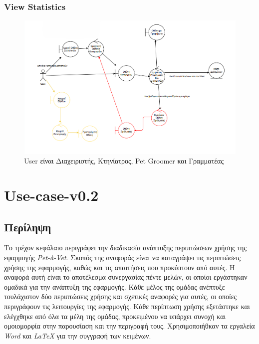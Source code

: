 \documentclass[12pt,a4paper,twoside]{book}
\begin{document}
\subsection{View Statistics}
\begin{figure}[H]
    \centering
    \includegraphics[width=\textwidth]{Resources/Robustness Diagram/Statistics.png}
    \caption{User είναι Διαχειριστής, Κτηνίατρος, Pet Groomer και Γραμματέας}\label{fig:robustness-view-statistics}
\end{figure}

\chapter{Use-case-v0.2}

\section{Περίληψη}

Το τρέχον κεφάλαιο περιγράφει την διαδικασία ανάπτυξης περιπτώσεων χρήσης της εφαρμογής \textit{Pet-à-Vet}. Σκοπός της αναφοράς είναι να καταγράψει τις περιπτώσεις χρήσης της εφαρμογής, καθώς και τις απαιτήσεις που προκύπτουν από αυτές. Η αναφορά αυτή είναι το αποτέλεσμα συνεργασίας πέντε μελών, οι οποίοι εργάστηκαν ομαδικά για την ανάπτυξη της εφαρμογής. Κάθε μέλος της ομάδας ανέπτυξε τουλάχιστον δύο περιπτώσεις χρήσης και σχετικές αναφορές για αυτές, οι οποίες περιγράφουν τις λειτουργίες της εφαρμογής. Κάθε περίπτωση χρήσης εξετάστηκε και ελέγχθηκε από όλα τα μέλη της ομάδας, προκειμένου να υπάρχει συνοχή και ομοιομορφία στην παρουσίαση και την περιγραφή τους. Χρησιμοποιήθκαν τα εργαλεία \textit{Word} και \textit{LaTeX} για την συγγραφή των κειμένων. %
\end{document}
